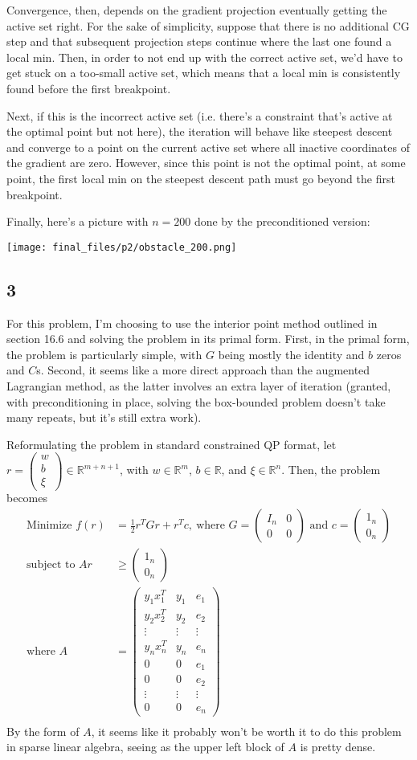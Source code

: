 \documentclass{article}
\newcommand{\openm}{\begin{pmatrix}}
\newcommand{\closem}{\end{pmatrix}}
\newcommand{\rn}{\mathbb{R}}
\begin{document}
Convergence, then, depends on the gradient projection eventually getting the active set right. For the sake of simplicity, suppose that there is no additional CG step and that subsequent projection steps continue where the last one found a local min. Then, in order to not end up with the correct active set, we'd have to get stuck on a too-small active set, which means that a local min is consistently found before the first breakpoint. 

Next, if this is the incorrect active set (i.e. there's a constraint that's active at the optimal point but not here), the iteration will behave like steepest descent and converge to a point on the current active set where all inactive coordinates of the gradient are zero. However, since this point is not the optimal point, at some point, the first local min on the steepest descent path must go beyond the first breakpoint.

Finally, here's a picture with $n=200$ done by the preconditioned version:

\texttt{[image: final\_files/p2/obstacle\_200.png]}
\subsection*{3}
For this problem, I'm choosing to use the interior point method outlined in section 16.6 and solving the problem in its primal form. First, in the primal form, the problem is particularly simple, with $G$ being mostly the identity and $b$ zeros and $C$s. Second, it seems like a more direct approach than the augmented Lagrangian method, as the latter involves an extra layer of iteration (granted, with preconditioning in place, solving the box-bounded problem doesn't take many repeats, but it's still extra work). 

Reformulating the problem in standard constrained QP format, let $r=\openm w\\b\\\xi\closem\in\rn^{m+n+1}$, with $w\in\rn^m$, $b\in\rn$, and $\xi\in\rn^n$. Then, the problem becomes 
\begin{align*}
    \text{Minimize }f(r)&=\frac{1}{2}r^TGr+r^Tc,\ \text{where }G=\openm I_n&0\\0&0\closem\text{ and }c=\openm1_n\\0_n\closem\\
    \text{subject to }Ar&\geq\openm1_n\\0_n\closem\\
    \text{where }A&=\openm y_1x_1^T&y_1&e_1\\y_2x_2^T&y_2&e_2\\\vdots&\vdots&\vdots\\y_nx_n^T&y_n&e_n\\0&0&e_1\\0&0&e_2\\\vdots&\vdots&\vdots\\0&0&e_n\closem\\
\end{align*}
By the form of $A$, it seems like it probably won't be worth it to do this problem in sparse linear algebra, seeing as the upper left block of $A$ is pretty dense. 
\end{document}
